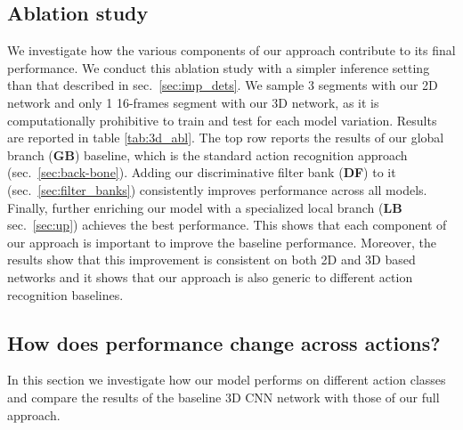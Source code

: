 \documentclass[10pt,twocolumn,letterpaper]{article}
\begin{document}
\subsection{Ablation study}\label{sec:exp:val}
We investigate how the various components of our approach contribute to its final performance. We conduct this ablation study with a simpler inference setting than that described in sec.~\ref{sec:imp_dets}. We sample 3 segments with our 2D network and only 1 16-frames segment with our 3D network, as it is computationally prohibitive to train and test for each model variation. Results are reported in table \ref{tab:3d_abl}. The top row reports the results of our global branch ({\bf GB}) baseline, which is the standard action recognition approach (sec.~\ref{sec:back-bone}). Adding our discriminative filter bank ({\bf DF}) to it (sec.~\ref{sec:filter_banks}) consistently improves performance across all models. Finally, further enriching our model with a specialized local branch ({\bf LB} sec.~\ref{sec:up}) achieves the best performance. This shows that each component of our approach is important to improve the baseline performance. Moreover, the results show that this improvement is consistent on both 2D and 3D based networks and it shows that our approach is also generic to different action recognition baselines.





\subsection{How does performance change across actions?} \label{sec:exp:actions}
In this section we investigate how our model performs on different action classes and compare the results of the baseline 3D CNN network with those of our full approach. 


\begin{table}
\centering
{}
\vspace{2mm}
\caption{\it Top-1 accuracy improvement brought by our full 3D approach over the baseline 3D network.\vspace{-3mm}}
\label{tab:metacategories}
\end{table}
\end{document}
